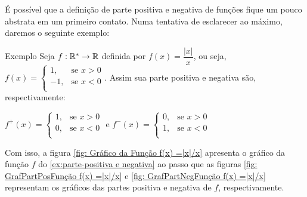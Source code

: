 É possível  que a definição de parte positiva e negativa de funções fique um pouco abstrata em um primeiro contato. 
Numa tentativa de esclarecer ao máximo, daremos o seguinte exemplo:
\begin{env}{Exemplo}
	\label{ex:parte-positiva e negativa}
    Seja $f: \mathbb{R}^* \to \mathbb{R}$ definida por $f(x) =\dfrac{|x|}{x}$, ou seja, 
    $f(x) = \left\{
    \begin{array}{ll}
    1,& \text{se\ } x > 0\\
    -1,& \text{se\ } x < 0\\	
    \end{array}\right. 
    $.
    Assim sua parte positiva e negativa são, respectivamente:
    \begin{center}
	    $f^+(x) = \left\{
	    \begin{array}{ll}
	    	1,& \text{se\ } x > 0\\
	    	0,& \text{se\ } x < 0\\	
	    \end{array}\right. 
	    $
	    e
	    $f^-(x) = \left\{
	    \begin{array}{ll}
	    	0,& \text{se\ } x > 0\\
	    	1,& \text{se\ } x < 0\\	
	    \end{array}\right. 
	    $	
    \end{center}
    
\vspace{-0.2cm}\end{env}

Com isso, a figura \ref{fig: Gráfico da Função f(x) =|x|/x} apresenta o gráfico da função $f$ do \ref{ex:parte-positiva e negativa} ao passo que as figuras \ref{fig: GrafPartPosFunção f(x) =|x|/x} e \ref{fig: GrafPartNegFunção f(x) =|x|/x} representam os gráficos das partes positiva e negativa de $f$, respectivamente.

